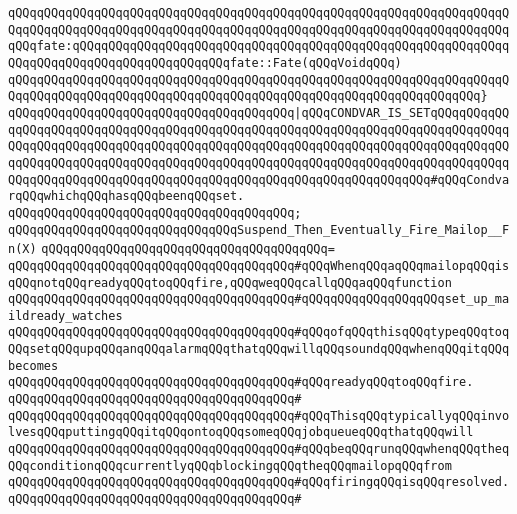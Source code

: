 \verb|qQQqqQQqqQQqqQQqqQQqqQQqqQQqqQQqqQQqqQQqqQQqqQQqqQQqqQQqqQQqqQQqqQQqqQQqqQQqqQQqqQQqqQQqqQQqqQQqqQQqqQQqqQQqqQQqqQQqqQQqqQQqqQQqqQQqqQQqqQQqqQQqfate:qQQqqQQqqQQqqQQqqQQqqQQqqQQqqQQqqQQqqQQqqQQqqQQqqQQqqQQqqQQqqQQqqQQqqQQqqQQqqQQqqQQqqQQqqQQqfate::Fate(qQQqVoidqQQq)|\newline
\verb|qQQqqQQqqQQqqQQqqQQqqQQqqQQqqQQqqQQqqQQqqQQqqQQqqQQqqQQqqQQqqQQqqQQqqQQqqQQqqQQqqQQqqQQqqQQqqQQqqQQqqQQqqQQqqQQqqQQqqQQqqQQqqQQqqQQqqQQq}|\newline
\verb|qQQqqQQqqQQqqQQqqQQqqQQqqQQqqQQqqQQqqQQq|\verb#|qQQqCONDVAR_IS_SETqQQqqQQqqQQqqQQqqQQqqQQqqQQqqQQqqQQqqQQqqQQqqQQqqQQqqQQqqQQqqQQqqQQqqQQqqQQqqQQqqQQqqQQqqQQqqQQqqQQqqQQqqQQqqQQqqQQqqQQqqQQqqQQqqQQqqQQqqQQqqQQqqQQqqQQqqQQqqQQqqQQqqQQqqQQqqQQqqQQqqQQqqQQqqQQqqQQqqQQqqQQqqQQqqQQqqQQqqQQqqQQqqQQqqQQqqQQqqQQqqQQqqQQqqQQqqQQqqQQqqQQqqQQqqQQqqQQqqQQq#\verb|#qQQqCondvarqQQqwhichqQQqhasqQQqbeenqQQqset.|\newline
\verb|qQQqqQQqqQQqqQQqqQQqqQQqqQQqqQQqqQQqqQQq;|\newline
\newline
\verb|qQQqqQQqqQQqqQQqqQQqqQQqqQQqqQQqSuspend_Then_Eventually_Fire_Mailop__Fn(X)|\newline
\verb|qQQqqQQqqQQqqQQqqQQqqQQqqQQqqQQqqQQqqQQq=|\newline
\verb|qQQqqQQqqQQqqQQqqQQqqQQqqQQqqQQqqQQqqQQq#qQQqWhenqQQqaqQQqmailopqQQqisqQQqnotqQQqreadyqQQqtoqQQqfire,qQQqweqQQqcallqQQqaqQQqfunction|\newline
\verb|qQQqqQQqqQQqqQQqqQQqqQQqqQQqqQQqqQQqqQQq#qQQqqQQqqQQqqQQqqQQqset_up_maildready_watches|\newline
\verb|qQQqqQQqqQQqqQQqqQQqqQQqqQQqqQQqqQQqqQQq#qQQqofqQQqthisqQQqtypeqQQqtoqQQqsetqQQqupqQQqanqQQqalarmqQQqthatqQQqwillqQQqsoundqQQqwhenqQQqitqQQqbecomes|\newline
\verb|qQQqqQQqqQQqqQQqqQQqqQQqqQQqqQQqqQQqqQQq#qQQqreadyqQQqtoqQQqfire.|\newline
\verb|qQQqqQQqqQQqqQQqqQQqqQQqqQQqqQQqqQQqqQQq#|\newline
\verb|qQQqqQQqqQQqqQQqqQQqqQQqqQQqqQQqqQQqqQQq#qQQqThisqQQqtypicallyqQQqinvolvesqQQqputtingqQQqitqQQqontoqQQqsomeqQQqjobqueueqQQqthatqQQqwill|\newline
\verb|qQQqqQQqqQQqqQQqqQQqqQQqqQQqqQQqqQQqqQQq#qQQqbeqQQqrunqQQqwhenqQQqtheqQQqconditionqQQqcurrentlyqQQqblockingqQQqtheqQQqmailopqQQqfrom|\newline
\verb|qQQqqQQqqQQqqQQqqQQqqQQqqQQqqQQqqQQqqQQq#qQQqfiringqQQqisqQQqresolved.|\newline
\verb|qQQqqQQqqQQqqQQqqQQqqQQqqQQqqQQqqQQqqQQq#|\newline
